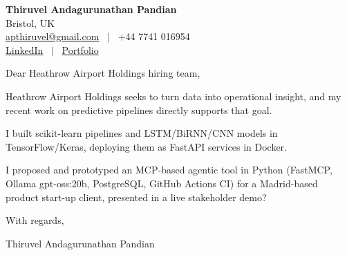\documentclass[11pt,a4paper]{article}
\begin{document}
\raggedright
\pagestyle{empty}

\begin{center}
    {\LARGE \color{linkblue} \textbf{Thiruvel Andagurunathan Pandian}}\\[0.2cm]
    Bristol, UK \\
    \href{mailto:apthiruvel@gmail.com}{apthiruvel@gmail.com} \ $|$ \ +44 7741 016954 \\
\href{https://www.linkedin.com/in/thiruvel-a-p/}{LinkedIn} \ $|$ \ \href{https://thiruvel-ap.github.io/PersonalPortfolio/}{Portfolio}
\end{center}

\vspace{0.4cm}

\noindent
Dear Heathrow Airport Holdings hiring team,

Heathrow Airport Holdings seeks to turn data into operational insight, and my recent work on predictive pipelines directly supports that goal.

I built scikit-learn pipelines and LSTM/BiRNN/CNN models in TensorFlow/Keras, deploying them as FastAPI services in Docker.

I proposed and prototyped an MCP-based agentic tool in Python (FastMCP, Ollama gpt-oss:20b, PostgreSQL, GitHub Actions CI) for a Madrid-based product start-up client, presented in a live stakeholder demo?

\vspace{0.5cm}

With regards,

Thiruvel Andagurunathan Pandian
\end{document}

